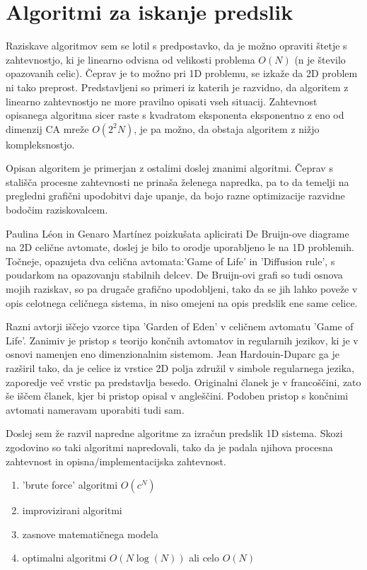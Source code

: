 \documentclass[12pt,a4paper,openany,twoside]{book}
\begin{document}
\section{Algoritmi za iskanje predslik}

Raziskave algoritmov sem se lotil s predpostavko, da je možno opraviti štetje s zahtevnostjo,
ki je linearno odvisna od velikosti problema \( O(N) \)  (n je število opazovanih celic). Čeprav je to možno pri 1D problemu,
se izkaže da 2D problem ni tako preprost. Predstavljeni so primeri iz katerih je razvidno,
da algoritem z linearno zahtevnostjo ne more pravilno opisati vseh situacij.
Zahtevnost opisanega algoritma sicer raste s kvadratom eksponenta eksponentno z eno
od dimenzij CA mreže  \( O(2^2N) \), je pa možno, da obstaja algoritem z nižjo kompleksnostjo.

Opisan algoritem je primerjan z ostalimi doslej znanimi algoritmi. Čeprav s stališča procesne
zahtevnosti ne prinaša želenega napredka, pa to da temelji na pregledni grafični upodobitvi
daje upanje, da bojo razne optimizacije razvidne bodočim raziskovalcem.

Paulina Léon in Genaro Martínez \cite{PaulinaGenaro2016} poizkušata aplicirati
De Bruijn-ove diagrame na 2D celične avtomate, doslej je bilo to orodje uporabljeno le na 1D problemih.
Točneje, opazujeta dva celična avtomata:'Game of Life' in 'Diffusion rule',
s poudarkom na opazovanju stabilnih delcev. De Bruijn-ovi grafi so tudi osnova mojih raziskav,
so pa drugače grafično upodobljeni, tako da se jih lahko poveže v opis celotnega celičnega sistema,
in niso omejeni na opis predslik ene same celice.

Razni avtorji \cite{Hartman2013} iščejo vzorce tipa 'Garden of Eden' v celičnem avtomatu 'Game of Life'.
Zanimiv je pristop s teorijo končnih avtomatov in regularnih jezikov, ki je v
osnovi namenjen eno dimenzionalnim sistemom. Jean Hardouin-Duparc ga je razširil
tako, da je celice iz vrstice 2D polja združil v simbole regularnega jezika, zaporedje več
vrstic pa predstavlja besedo. Originalni članek je v francoščini, zato še iščem članek,
kjer bi pristop opisal v angleščini. Podoben pristop s končnimi avtomati nameravam uporabiti tudi sam.

Doslej sem že razvil napredne algoritme za izračun predslik 1D sistema.
Skozi zgodovino so taki algoritmi napredovali, tako da je padala njihova
procesna zahtevnost in opisna/implementacijska zahtevnost.
\begin{enumerate}
 \item 'brute force' algoritmi \( O(c^N) \)
 \item improvizirani algoritmi
 \item zasnove matematičnega modela
 \item optimalni algoritmi \( O(N \log(N)) \) ali celo \( O(N) \)
\end{enumerate}
\end{document}
